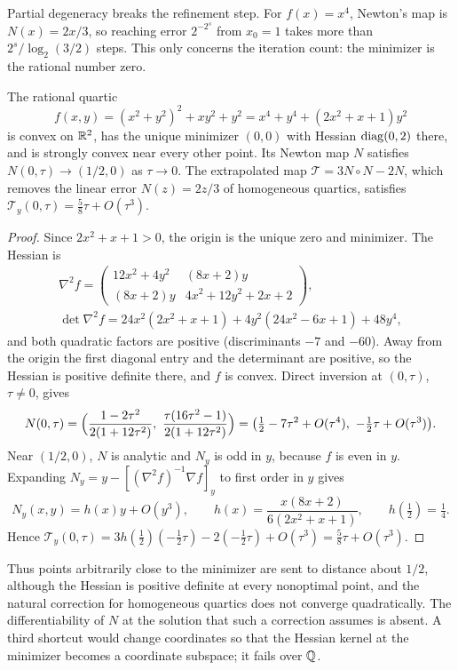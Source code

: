 Partial degeneracy breaks the refinement step. For $f(x)=x^4$, Newton's map
is $N(x)=2x/3$, so reaching error $2^{-2^s}$ from $x_0=1$ takes more than
$2^s/\log_2(3/2)$ steps. This only concerns the iteration count: the minimizer
is the rational number zero.

\begin{proposition}
\label{prop:bnd-newton}
The rational quartic
\[
f(x,y)=(x^2+y^2)^2+xy^2+y^2=x^4+y^4+(2x^2+x+1)y^2
\]
is convex on $\mathbb R^2$, has the unique minimizer $(0,0)$ with Hessian
$\operatorname{diag}(0,2)$ there, and is strongly convex near every other point. Its Newton
map $N$ satisfies $N(0,\tau)\to(1/2,0)$ as $\tau\to0$. The extrapolated map
$\mathcal T=3N\circ N-2N$, which removes the linear error $N(z)=2z/3$ of
homogeneous quartics, satisfies $\mathcal T_y(0,\tau)=\tfrac58\tau+O(\tau^3)$.
\end{proposition}

\begin{proof}
Since $2x^2+x+1>0$, the origin is the unique zero and minimizer. The Hessian
is
\begin{gather*}
\nabla^2f=\begin{pmatrix}12x^2+4y^2&(8x+2)y\\(8x+2)y&4x^2+12y^2+2x+2\end{pmatrix},\\
\det\nabla^2f=24x^2(2x^2+x+1)+4y^2(24x^2-6x+1)+48y^4,
\end{gather*}
and both quadratic factors are positive (discriminants $-7$ and $-60$). Away
from the origin the first diagonal entry and the determinant are positive, so
the Hessian is positive definite there, and $f$ is convex. Direct inversion
at $(0,\tau)$, $\tau\ne0$, gives
\[
N(0,\tau)=\Bigl(\frac{1-2\tau^2}{2(1+12\tau^2)},\
\frac{\tau(16\tau^2-1)}{2(1+12\tau^2)}\Bigr)
=\bigl(\tfrac12-7\tau^2+O(\tau^4),\ -\tfrac12\tau+O(\tau^3)\bigr).
\]
Near $(1/2,0)$, $N$ is analytic and $N_y$ is odd in $y$, because $f$ is even
in $y$. Expanding $N_y=y-[(\nabla^2f)^{-1}\nabla f]_y$ to first order in $y$
gives
\[
N_y(x,y)=h(x)y+O(y^3),\qquad h(x)=\frac{x(8x+2)}{6(2x^2+x+1)},\qquad
h(\tfrac12)=\tfrac14 .
\]
Hence $\mathcal T_y(0,\tau)=3h(\tfrac12)(-\tfrac12\tau)-2(-\tfrac12\tau)+
O(\tau^3)=\tfrac58\tau+O(\tau^3)$.
\end{proof}

Thus points arbitrarily close to the minimizer are sent to distance about
$1/2$, although the Hessian is positive definite at every nonoptimal point,
and the natural correction for homogeneous quartics does not converge
quadratically. The differentiability of $N$ at the solution that such a
correction assumes is absent. A third shortcut would change coordinates so
that the Hessian kernel at the minimizer becomes a coordinate subspace; it
fails over $\mathbb Q$.

